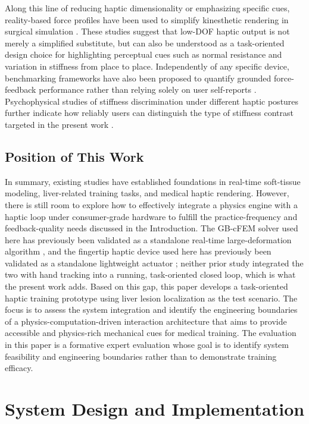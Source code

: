 \documentclass{ieeeaccess}
\begin{document}
Along this line of reducing haptic dimensionality or emphasizing specific cues, reality-based force profiles have been used to simplify kinesthetic rendering in surgical simulation \cite{bjelland2025haptic}. These studies suggest that low-DOF haptic output is not merely a simplified substitute, but can also be understood as a task-oriented design choice for highlighting perceptual cues such as normal resistance and variation in stiffness from place to place. Independently of any specific device, benchmarking frameworks have also been proposed to quantify grounded force-feedback performance rather than relying solely on user self-reports \cite{fazlollahi2023haptify}. Psychophysical studies of stiffness discrimination under different haptic postures further indicate how reliably users can distinguish the type of stiffness contrast targeted in the present work \cite{hafiz2022effect}.

\subsection{Position of This Work}
In summary, existing studies have established foundations in real-time soft-tissue modeling, liver-related training tasks, and medical haptic rendering. However, there is still room to explore how to effectively integrate a physics engine with a haptic loop under consumer-grade hardware to fulfill the practice-frequency and feedback-quality needs discussed in the Introduction. The GB-cFEM solver used here has previously been validated as a standalone real-time large-deformation algorithm \cite{wang2025group}, and the fingertip haptic device used here has previously been validated as a standalone lightweight actuator \cite{xu2025lightweight}; neither prior study integrated the two with hand tracking into a running, task-oriented closed loop, which is what the present work adds. Based on this gap, this paper develops a task-oriented haptic training prototype using liver lesion localization as the test scenario. The focus is to assess the system integration and identify the engineering boundaries of a physics-computation-driven interaction architecture that aims to provide accessible and physics-rich mechanical cues for medical training. The evaluation in this paper is a formative expert evaluation whose goal is to identify system feasibility and engineering boundaries rather than to demonstrate training efficacy.

\section{System Design and Implementation}
\end{document}
